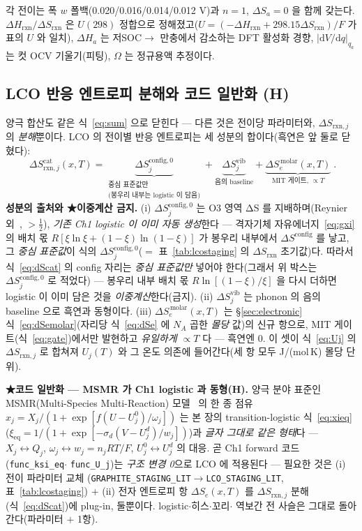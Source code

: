 \documentclass[11pt,a4paper]{article}
\newcommand{\dd}{\mathrm{d}}
\newcommand{\eq}{\mathrm{eq}}
\newcommand{\rxn}{\mathrm{rxn}}
\newcommand{\code}[1]{\texttt{#1}}
\begin{document}
각 전이는 폭 $w$ 폴백(0.020/0.016/0.014/0.012 V)과 $n=1$, $\Delta S_a=0$ 을 함께 갖는다. $\Delta H_\rxn/\Delta S_\rxn$
은 $U(298)$ 정합으로 정해졌고($U=(-\Delta H_\rxn+298.15\Delta S_\rxn)/F$ 가 표의 $U$ 와 일치), $\Delta H_a$ 는 저SOC$\to$
만충에서 감소하는 DFT 활성화 경향, $|\dd V/\dd q|_{q_a}$ 는 컷 OCV 기울기(피팅), $\Omega$ 는 정규용액 추정이다.

\subsection{LCO 반응 엔트로피 분해와 코드 일반화 (H)}\label{sec:lco-sum}
양극 합산도 같은 식~\eqref{eq:sum} 으로 닫힌다 — 다른 것은 전이당 파라미터와, $\Delta S_{\rxn,j}$ 의 \emph{분해}뿐이다.
LCO 의 전이별 반응 엔트로피는 세 성분의 합이다(흑연은 앞 둘로 닫혔다):
\begin{equation}
\boxed{\;\Delta S_{\rxn,j}^\mathrm{cat}(x,T)
=\underbrace{\Delta S^{\mathrm{config},0}_j}_{\substack{\text{중심 표준값만}\\ \text{(봉우리 내부는 logistic 이 담음)}}}
+\underbrace{\Delta S^\mathrm{vib}_j}_{\text{음의 baseline}}
+\underbrace{\Delta S_e^{\,\mathrm{molar}}(x,T)}_{\text{MIT 게이트, }\propto T}\;.}
\label{eq:dScat}
\end{equation}
\textbf{성분의 출처와 ★이중계산 금지.} (i) $\Delta S^{\mathrm{config},0}_j$ 는 O3 영역 ΔS 를 지배하며(Reynier 외~\cite{reynier2004}, $>\tfrac12$),
\emph{기존 Ch1 logistic 이 이미 자동 생성}한다 — 격자기체 자유에너지~\eqref{eq:gxi} 의 배치 몫
$R[\xi\ln\xi+(1-\xi)\ln(1-\xi)]$ 가 봉우리 내부에서 $\Delta S^\mathrm{config}$ 를 낳고, 그 \emph{중심 표준값}이 식의
$\Delta S^{\mathrm{config},0}_j$($=$ 표~\ref{tab:lcostaging} 의 $\Delta S_\rxn$ 초기값)다. 따라서 식~\eqref{eq:dScat} 의
config 자리는 \emph{중심 표준값만} 넣어야 한다(그래서 위 박스는 $\Delta S^{\mathrm{config},0}_j$ 로 적었다) — 봉우리 내부
배치 몫 $R\ln[(1-\xi)/\xi]$ 을 다시 더하면 logistic 이 이미 담은 것을 \emph{이중계산}한다(금지). (ii)
$\Delta S^\mathrm{vib}_j$ 는 phonon 의 음의 baseline 으로 흑연과 동형이다. (iii) $\Delta S_e^{\,\mathrm{molar}}(x,T)$ 는
\S\ref{sec:electronic} 식~\eqref{eq:dSemolar}(자리당 식~\eqref{eq:dSe} 에 $N_A$ 곱한 \emph{몰당} 값)의 신규 항으로,
MIT 게이트(식~\eqref{eq:gate})에서만 발현하고 \emph{유일하게 $\propto T$} 다 — 흑연엔 $0$. 이 셋이 식~\eqref{eq:Uj}
의 $\Delta S_{\rxn,j}$ 로 합쳐져 $U_j(T)$ 와 그 온도 의존에 들어간다(세 항 모두 J/(mol\,K) 몰당 단위).

\textbf{★코드 일반화 — MSMR 가 Ch1 logistic 과 동형(H).} 양극 분야 표준인 MSMR(Multi-Species Multi-Reaction) 모델~\cite{msmr2024} 의
한 종 점유 $x_j=X_j/(1+\exp[f(U-U_j^0)/\omega_j])$ 는 본 장의 transition-logistic 식~\eqref{eq:xieq}
($\xi_\eq=1/(1+\exp[-\sigma_d(V-U_j^d)/w_j])$)과 \emph{글자 그대로 같은 형태}다 — $X_j\leftrightarrow Q_j$,
$\omega_j\leftrightarrow w_j=n_jRT/F$, $U_j^0\leftrightarrow U_j^d$ 의 대응. 곧 Ch1 forward 코드(\code{func\_ksi\_eq}$\cdot$
\code{func\_U\_j})는 \emph{구조 변경 0}으로 LCO 에 적용된다 — 필요한 것은 (i) 전이 파라미터 교체
(\code{GRAPHITE\_STAGING\_LIT}$\to$\code{LCO\_STAGING\_LIT}, 표~\ref{tab:lcostaging}) + (ii) 전자 엔트로피 항
$\Delta S_e(x,T)$ 를 $\Delta S_{\rxn,j}$ 분해(식~\eqref{eq:dScat})에 plug-in, 둘뿐이다. logistic$\cdot$히스$\cdot$꼬리$\cdot$
역보간 전 사슬은 그대로 돌아간다(파라미터 $+$ 1항).
\end{document}
